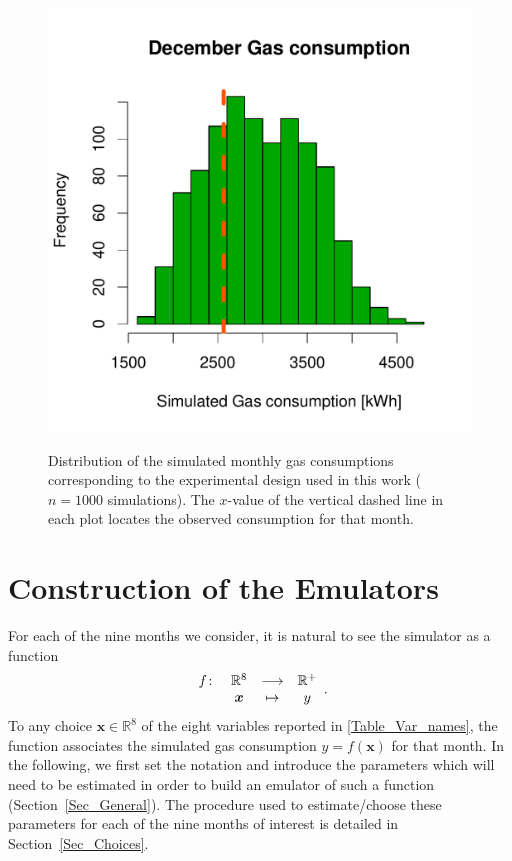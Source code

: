 \documentclass[a4paper, 12pt]{article}
\newcommand{\R}{\mathbb{R}}
\newcommand{\bd}[1]{\boldsymbol{#1}}
\newcommand{\x}{\bd x}
\begin{document}
\begin{figure}
 \includegraphics[width=\scale]{Simulation_histograms/Batch_2_Only/December_Gas}\\
 \caption{Distribution of the simulated monthly gas
 consumptions corresponding to the experimental design used in this work ($n=1000$ simulations).
 The $x$-value of the vertical dashed line in each plot locates the observed consumption for that month.}
 \label{Fig_Output_Hist}
\end{figure}





\section{Construction of the Emulators}\label{Sec_Emulators}

For each of the nine months we consider, it is natural to see the simulator as a function
\begin{equation*}
\begin{array}{l c c c}
 f \colon &  \R^8   & \longrightarrow & \R^+ \\
          &   \x  &     \mapsto     &  y
\end{array}.
\end{equation*}
To any choice $\x \in \R^8$ of the eight variables reported in \autoref{Table_Var_names}, the function associates the simulated gas consumption 
$y=f(\x)$ for that month.
In the following, we first set the notation and introduce the parameters which will need to be estimated in order to build an emulator of such a function (Section~\ref{Sec_General}). The procedure used to estimate/choose these parameters for each of the nine months of interest is detailed in Section~\ref{Sec_Choices}.
\end{document}
